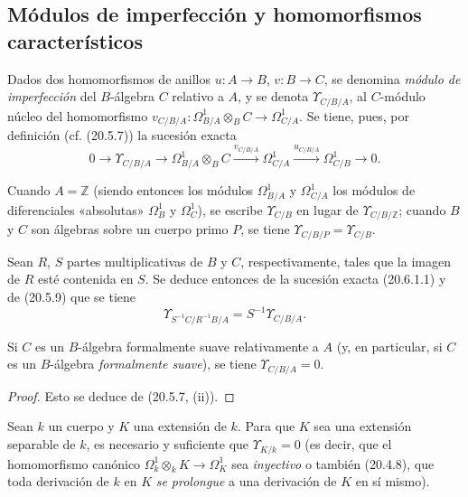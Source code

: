 \subsection{Módulos de imperfección y homomorfismos característicos}
\label{subsection:0.20.6-fr}
\label{0.20.6-fr}

\begin{definition}[20.6.1]
\label{0.20.6.1-fr}
Dados dos homomorfismos de anillos $u:A\to B$, $v:B\to C$, se
denomina \emph{módulo de imperfección} del $B$-álgebra $C$ relativo a
$A$, y se denota $\Upsilon_{C/B/A}$, al $C$-módulo núcleo del
homomorfismo
$v_{C/B/A}:\Omega^1_{B/A}\otimes_B C\to\Omega^1_{C/A}$.
Se tiene, pues, por definición (cf. (20.5.7)) la sucesión exacta
\begin{equation}
\tag{20.6.1.1}
\label{0.20.6.1.1-fr}
  0\longrightarrow\Upsilon_{C/B/A}\longrightarrow
  \Omega^1_{B/A}\otimes_B C\xrightarrow{v_{C/B/A}}
  \Omega^1_{C/A}\xrightarrow{u_{C/B/A}}\Omega^1_{C/B}
  \longrightarrow0.
\end{equation}
\end{definition}

Cuando $A=\mathbb{Z}$ (siendo entonces los módulos $\Omega^1_{B/A}$ y $\Omega^1_{C/A}$
los módulos de diferenciales «absolutas» $\Omega^1_B$ y
$\Omega^1_C$), se escribe $\Upsilon_{C/B}$ en lugar de
$\Upsilon_{C/B/\mathbb{Z}}$; cuando $B$ y $C$ son álgebras sobre un
cuerpo primo $P$, se tiene $\Upsilon_{C/B/P}=\Upsilon_{C/B}$.

Sean $R$, $S$ partes multiplicativas de $B$ y $C$, respectivamente,
tales que la imagen de $R$ esté contenida en $S$. Se deduce entonces de la
sucesión exacta (20.6.1.1) y de (20.5.9) que se tiene
\begin{equation}
\tag{20.6.1.2}
\label{0.20.6.1.2-fr}
  \Upsilon_{S^{-1}C/R^{-1}B/A}=S^{-1}\Upsilon_{C/B/A}.
\end{equation}

\begin{proposition}[20.6.2]
\label{0.20.6.2-fr}
Si $C$ es un $B$-álgebra formalmente suave relativamente a $A$ \textup{(y, en
particular, si $C$ es un $B$-álgebra \emph{formalmente suave})}, se tiene
$\Upsilon_{C/B/A}=0$.
\end{proposition}

\begin{proof}
Esto se deduce de (20.5.7, (ii)).
\end{proof}

\begin{proposition}[20.6.3]
\label{0.20.6.3-fr}
Sean $k$ un cuerpo y $K$ una extensión de $k$. Para que $K$ sea una
extensión separable de $k$, es necesario y suficiente que $\Upsilon_{K/k}=0$
\textup{(es decir, que el homomorfismo canónico
$\Omega^1_k\otimes_k K\to\Omega^1_K$ sea \emph{inyectivo} o también (20.4.8), que
toda derivación de $k$ en $K$ \emph{se prolongue} a una derivación de $K$
en sí mismo)}.
\end{proposition}

